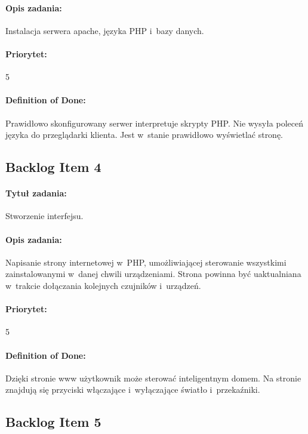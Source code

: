 \paragraph{Opis zadania:}
Instalacja serwera apache, języka PHP i~bazy danych.

\paragraph{Priorytet:}
5

\paragraph{Definition of Done:}
Prawidłowo skonfigurowany serwer interpretuje skrypty PHP. Nie wysyła poleceń języka do przeglądarki klienta. Jest w~stanie prawidłowo wyświetlać stronę.


	\subsection{Backlog Item 4}
	\paragraph{Tytuł zadania:}
	Stworzenie interfejsu.
	
	\paragraph{Opis zadania:}
	Napisanie strony internetowej w~PHP, umożliwiającej sterowanie wszystkimi zainstalowanymi w~danej chwili urządzeniami. Strona powinna być uaktualniana w~trakcie dołączania kolejnych czujników i~urządzeń.
	
	\paragraph{Priorytet:}
	5
	
	\paragraph{Definition of Done:}
	Dzięki stronie www użytkownik może sterować inteligentnym domem. Na stronie znajdują się przyciski włączające i~wyłączające światło i~przekaźniki.


	\subsection{Backlog Item 5}
